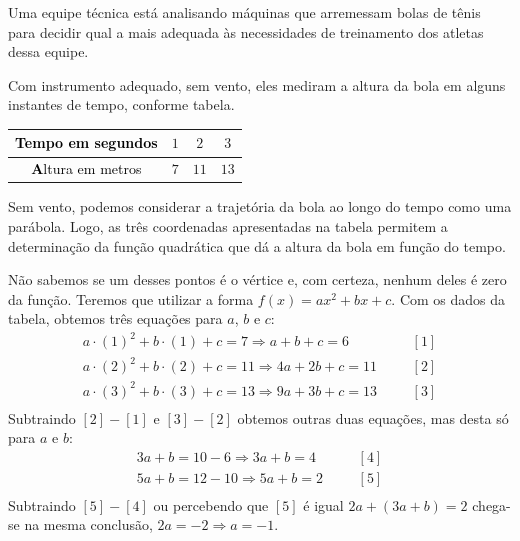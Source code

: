 \begin{example}{}

Uma equipe técnica está analisando máquinas que arremessam bolas de tênis para decidir qual a mais adequada às necessidades de treinamento dos atletas dessa equipe.

Com instrumento adequado, sem vento, eles mediram a altura da bola em alguns instantes de tempo, conforme tabela.

\begin{table}[H]
\centering
\begin{tabu} to \textwidth{|c|c|c|c|}
\hline
{}\textcolor{black}{\textbf Tempo em segundos} & \(1\) & \(2\) & \(3\) \\
\hline
{}\textcolor{black}{\textbf Altura em metros} & \(7\) & \(11\) & \(13\) \\
\hline
\end{tabu}
\end{table}


Sem vento, podemos considerar a trajetória da bola ao longo do tempo como uma parábola. Logo, as três coordenadas apresentadas na tabela permitem a determinação da função quadrática que dá a altura da bola em função do tempo.

Não sabemos se um desses pontos é o vértice e, com certeza, nenhum deles é zero da função. Teremos que utilizar a forma \(f(x)=ax^2+bx+c\). Com os dados da tabela, obtemos três equações para \(a\), \(b\) e \(c\):
\begin{equation*}
\begin{split}a \cdot (1)^2+b \cdot (1)+c=7 \Rightarrow a+b+c=6 \;\;\;\;\;\; & [1] \\
a \cdot (2)^2+b \cdot (2)+c=11 \Rightarrow 4a+2b+c=11 \;\;\;\;\;\; & [2] \\
a \cdot (3)^2+b \cdot (3)+c=13 \Rightarrow 9a+3b+c=13 \;\;\;\;\;\; & [3] \\\end{split}
\end{equation*}
Subtraindo \([2]-[1]\) e \([3]-[2]\) obtemos outras duas equações, mas desta só para \(a\) e \(b\):
\begin{equation*}
\begin{split}3a+b=10-6 \Rightarrow 3a+b=4 \;\;\;\;\;\; & [4] \\
5a+b=12-10 \Rightarrow 5a+b=2 \;\;\;\;\;\; & [5] \\\end{split}
\end{equation*}
Subtraindo \([5]-[4]\) ou percebendo que \([5]\) é igual \(2a+(3a+b)=2\) chega-se na mesma conclusão, \(2a=-2 \Rightarrow a=-1\).


\end{example}
